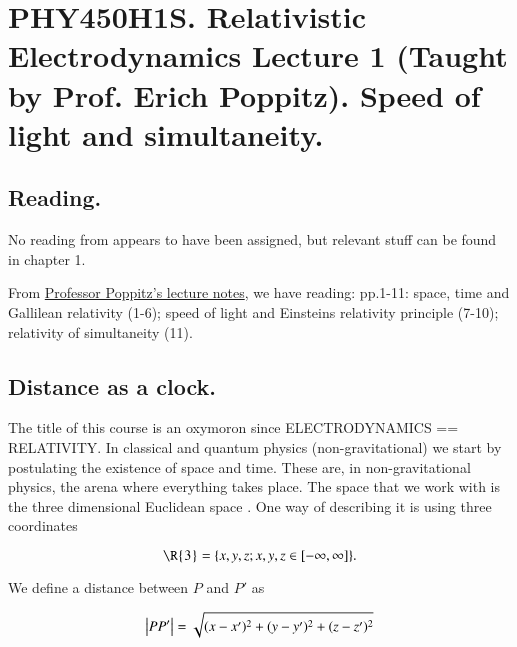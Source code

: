 %
%

\chapter{PHY450H1S.  Relativistic Electrodynamics Lecture 1 (Taught by Prof. Erich Poppitz).  Speed of light and simultaneity.}
\label{chap:relativisticElectrodynamicsL1}
{}
\date{Jan 11, 2011}

\beginArtNoToc

\section{Reading.}

No reading from \cite{landau1980classical} appears to have been assigned, but relevant stuff can be found in chapter 1.

From \href{http://www.physics.utoronto.ca/~poppitz/e-poppitz/PHY450_files/RelEMp1-11.pdf}{Professor Poppitz's lecture notes}, we have reading: pp.1-11: space, time and Gallilean relativity (1-6); speed of light and Einsteins relativity principle (7-10); relativity of simultaneity (11).

\section{Distance as a clock.}

The title of this course is an oxymoron since ELECTRODYNAMICS == RELATIVITY.  In classical and quantum physics (non-gravitational) we start by postulating the existence of space and time.  These are, in non-gravitational physics, the arena where everything takes place.  The space that we work with is the three dimensional Euclidean space .  One way of describing it is using three coordinates

\begin{equation}\label{eqn:relativisticElectrodynamicsL1:10}
\text{\R{3}} = \{ x, y, z ; x,y,z \in [-\infty,\infty] \}.
\end{equation}

We define a distance between $P$ and $P'$ as

\begin{equation}\label{eqn:relativisticElectrodynamicsL1:20}
\left\lvert{P P' }\right\rvert = \sqrt{ (x-x')^2 + (y-y')^2 + (z-z')^2 }
\end{equation}

